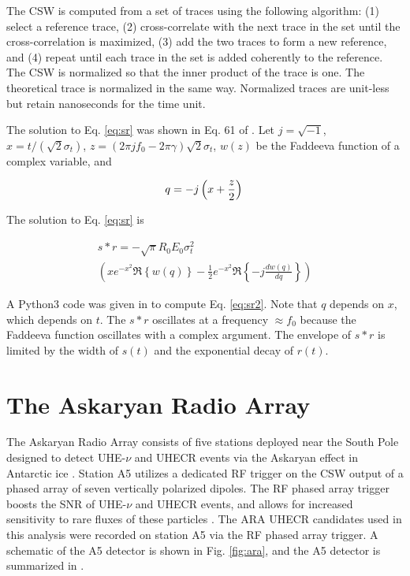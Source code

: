 \documentclass[amsmath,amssymb,aps,prd,10pt,twocolumn,showkeys]{revtex4}
\begin{document}
The CSW is computed from a set of traces using the following algorithm: (1) select a reference trace, (2) cross-correlate with the next trace in the set until the cross-correlation is maximized, (3) add the two traces to form a new reference, and (4) repeat until each trace in the set is added coherently to the reference.  The CSW is normalized so that the inner product of the trace is one.  The theoretical trace is normalized in the same way.  Normalized traces are unit-less but retain nanoseconds for the time unit.

The solution to Eq. \ref{eq:sr} was shown in Eq. 61 of \cite{hanson2026complex-a31}.  Let $j = \sqrt{-1}$, $x = t/(\sqrt{2}\sigma_t)$, $z = (2\pi j f_0 - 2\pi\gamma)\sqrt{2}\sigma_t$, $w(z)$ be the Faddeeva function of a complex variable, and

\begin{equation}
q = -j\left(x + \frac{z}{2}\right) \\
\end{equation}

The solution to Eq. \ref{eq:sr} is

\begin{multline}
s * r = -\sqrt{\pi}R_0 E_0 \sigma_t^2 \\ \left(xe^{-x^2} \Re\left\lbrace w(q) \right\rbrace - \frac{1}{2}e^{-x^2} \Re\left\lbrace -j \frac{d w(q)}{dq} \right\rbrace \right) \label{eq:sr2}
\end{multline}

A Python3 code was given in \cite{hanson2026complex-a31} to compute Eq. \ref{eq:sr2}.  Note that $q$ depends on $x$, which depends on $t$.  The $s * r$ oscillates at a frequency $\approx f_0$ because the Faddeeva function oscillates with a complex argument.  The envelope of $s * r$ is limited by the width of $s(t)$ and the exponential decay of $r(t)$.

\section{The Askaryan Radio Array}
\label{sec:ara}

The Askaryan Radio Array consists of five stations deployed near the South Pole designed to detect UHE-$\nu$ and UHECR events via the Askaryan effect in Antarctic ice \cite{allison2022lowthreshold-795,10.1103/physrevd.102.043021,allison2012design-cd3,testbed}.  Station A5 utilizes a dedicated RF trigger on the CSW output of a phased array of seven vertically polarized dipoles.  The RF phased array trigger boosts the SNR of UHE-$\nu$ and UHECR events, and allows for increased sensitivity to rare fluxes of these particles \cite{avva2017development-713}.  The ARA UHECR candidates used in this analysis were recorded on station A5 via the RF phased array trigger.  A schematic of the A5 detector is shown in Fig. \ref{fig:ara}, and the A5 detector is summarized in \cite{allison2022lowthreshold-795}.
\end{document}
